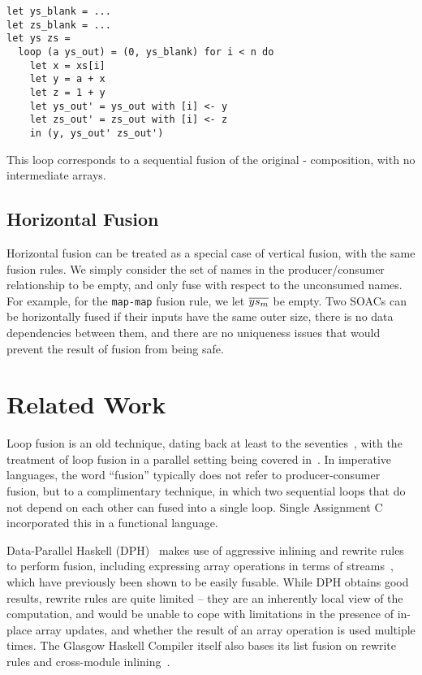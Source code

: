 \begin{lstlisting}
let ys_blank = ...
let zs_blank = ...
let ys zs =
  loop (a ys_out) = (0, ys_blank) for i < n do
    let x = xs[i]
    let y = a + x
    let z = 1 + y
    let ys_out' = ys_out with [i] <- y
    let zs_out' = zs_out with [i] <- z
    in (y, ys_out' zs_out')
\end{lstlisting}

This loop corresponds to a sequential fusion of the original
- composition, with no intermediate arrays.

\subsection{Horizontal Fusion}

Horizontal fusion can be treated as a special case of vertical fusion,
with the same fusion rules.  We simply consider the set of names in
the producer/consumer relationship to be empty, and only fuse with
respect to the unconsumed names.  For example, for the
\lstinline{map-map} fusion rule, we let $\overline{ys_{m}}$ be empty.  Two
SOACs can be horizontally fused if their inputs have the same outer
size, there is no data dependencies between them, and there are no
uniqueness issues that would prevent the result of fusion from being
safe.

\section{Related Work}

Loop fusion is an old technique, dating back at least to the
seventies~\cite{cheatham1977programming}, with the treatment of loop
fusion in a parallel setting being covered
in~\cite{midki1990issues}. In imperative languages, the word
``fusion'' typically does not refer to producer-consumer fusion, but
to a complimentary technique, in which two sequential loops that do
not depend on each other can fused into a single loop.  Single
Assignment C~\cite{grelck2006sac} incorporated this in a functional
language.

Data-Parallel Haskell (DPH)~\cite{Chak06DPH} makes use of
aggressive inlining and rewrite rules to perform fusion, including
expressing array operations in terms of
streams~\cite{coutts2007rewriting}, which have previously been shown
to be easily fusable.  While DPH obtains good results, rewrite rules
are quite limited -- they are an inherently local view of the
computation, and would be unable to cope with limitations in the
presence of in-place array updates, and whether the result of an array
operation is used multiple times.  The Glasgow Haskell Compiler itself
also bases its list fusion on rewrite rules and cross-module
inlining~\cite{jones2001playing}.

